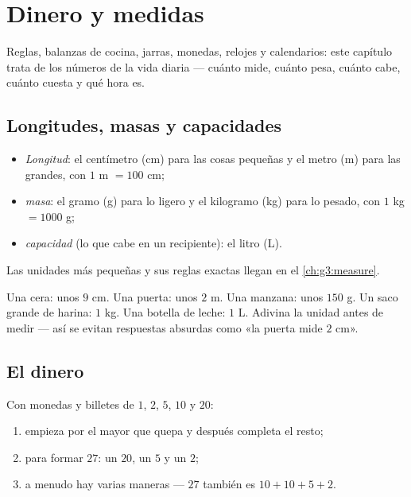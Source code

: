 \chapter{Dinero y medidas}\label{ch:g2:measure}

Reglas, balanzas de cocina, jarras, monedas, relojes y
calendarios: este capítulo trata de los números de la vida diaria ---
cuánto mide, cuánto pesa, cuánto cabe, cuánto cuesta y qué
hora es.

\section{Longitudes, masas y capacidades}

\begin{definition}\label{def:g2:measure:units}
\begin{itemize}
  \item \emph{Longitud}: el centímetro (cm) para las cosas pequeñas y el metro (m)
        para las grandes, con $1$ m $= 100$ cm;
  \item \emph{masa}: el gramo (g) para lo ligero y el kilogramo (kg) para
        lo pesado, con $1$ kg $= 1000$ g;
  \item \emph{capacidad} (lo que cabe en un recipiente): el litro (L).
\end{itemize}
Las unidades más pequeñas y sus reglas exactas llegan en el \cref{ch:g3:measure}.
\end{definition}

\begin{example}\label{ex:g2:measure:choose}
Una cera: unos $9$ cm. Una puerta: unos $2$ m. Una manzana: unos $150$
g. Un saco grande de harina: $1$ kg. Una botella de leche: $1$ L. Adivina la unidad
antes de medir --- así se evitan respuestas absurdas como «la puerta mide $2$
cm».
\end{example}

\section{El dinero}

\begin{method}\label{met:g2:measure:money}
Con monedas y billetes de $1$, $2$, $5$, $10$ y $20$:
\begin{enumerate}
  \item empieza por el mayor que quepa y después completa el resto;
  \item para formar $27$: un $20$, un $5$ y un $2$;
  \item a menudo hay varias maneras --- $27$ también es $10 + 10 + 5 +
        2$.
\end{enumerate}
\end{method}

